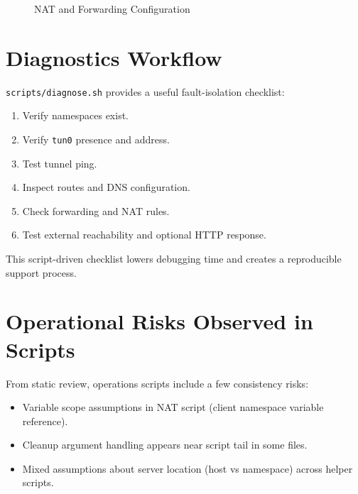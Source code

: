 \begin{figure}[H]
\centering
{}
\caption{NAT and Forwarding Configuration}
\end{figure}

\section{Diagnostics Workflow}
\texttt{scripts/diagnose.sh} provides a useful fault-isolation checklist:
\begin{enumerate}[leftmargin=2em]
\item Verify namespaces exist.
\item Verify \texttt{tun0} presence and address.
\item Test tunnel ping.
\item Inspect routes and DNS configuration.
\item Check forwarding and NAT rules.
\item Test external reachability and optional HTTP response.
\end{enumerate}

This script-driven checklist lowers debugging time and creates a reproducible support process.

\section{Operational Risks Observed in Scripts}
From static review, operations scripts include a few consistency risks:
\begin{itemize}[leftmargin=2em]
\item Variable scope assumptions in NAT script (client namespace variable reference).
\item Cleanup argument handling appears near script tail in some files.
\item Mixed assumptions about server location (host vs namespace) across helper scripts.
\end{itemize}

